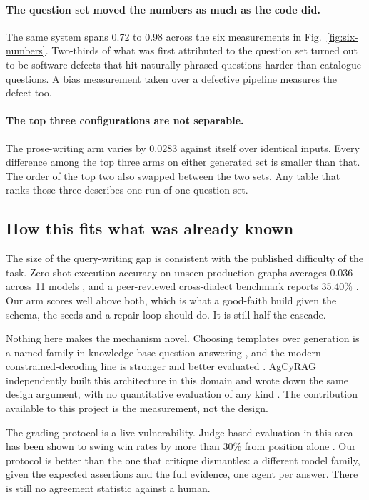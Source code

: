 \paragraph{The question set moved the numbers as much as the code did.} The same
system spans 0.72 to 0.98 across the six measurements in
Fig.~\ref{fig:six-numbers}. Two-thirds of what was first attributed to the
question set turned out to be software defects that hit naturally-phrased
questions harder than catalogue questions. A bias measurement taken over a
defective pipeline measures the defect too. 

\paragraph{The top three configurations are not separable.} The prose-writing
arm varies by 0.0283 against itself over identical inputs. Every difference
among the top three arms on either generated set is smaller than that. The order
of the top two also swapped between the two sets. Any table that ranks those
three describes one run of one question set. 

\subsection{How this fits what was already known}

The size of the query-writing gap is consistent with the published difficulty of
the task. Zero-shot execution accuracy on unseen production graphs averages
0.036 across 11 models \citep{pipecypher}, and a peer-reviewed cross-dialect
benchmark reports 35.40\% \citep{gqlbench}. Our arm scores well above both,
which is what a good-faith build given the schema, the seeds and a repair loop
should do. It is still half the cascade.

Nothing here makes the mechanism novel. Choosing templates over generation is a
named family in knowledge-base question answering \citep{aqqu, tqa, kbqasurvey},
and the modern constrained-decoding line is stronger and better evaluated
\citep{picard}. AgCyRAG independently built this architecture in this domain and
wrote down the same design argument, with no quantitative evaluation of any kind
\citep{agcyrag}. The contribution available to this project is the measurement,
not the design.

The grading protocol is a live vulnerability. Judge-based evaluation in this
area has been shown to swing win rates by more than 30\% from position alone
\citep{gzeng}. Our protocol is better than the one that critique dismantles: a
different model family, given the expected assertions and the full evidence, one
agent per answer. There is still no agreement statistic against a human.

